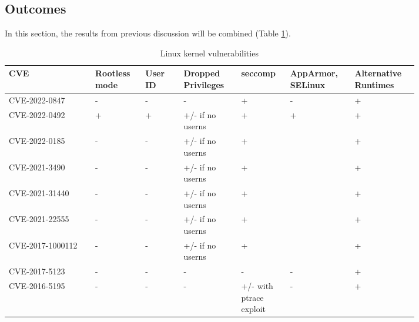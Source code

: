 \FloatBarrier
\clearpage


\subsection{Outcomes}

In this section, the results from previous discussion will be combined (Table \ref{tab:h:10}).

\begin{table}[H]
    \centering \small
    \begin{tabular}{| p{0.18\linewidth} | p{0.1\linewidth} | p{0.08\linewidth} | p{0.12\linewidth} | p{0.09\linewidth} | p{0.12\linewidth} | p{0.12\linewidth} |} \hline
    CVE & Rootless mode & User ID & Dropped Privileges & seccomp & AppArmor, SELinux & Alternative Runtimes \\ \hline
    CVE-2022-0847 & - & - & - & \cellcolor{green!25} + & - & \cellcolor{green!25} +  \\ \hline
    CVE-2022-0492 & \cellcolor{green!25} + & \cellcolor{green!25} + & \cellcolor{yellow!25} +/- \linebreak if no userns & \cellcolor{green!25} + & \cellcolor{green!25} + & \cellcolor{green!25} + \\ \hline
    CVE-2022-0185 & - & - & \cellcolor{yellow!25} +/- \linebreak if no userns & \cellcolor{green!25} + &  & \cellcolor{green!25} + \\ \hline
    CVE-2021-3490 & - & - & \cellcolor{yellow!25} +/- \linebreak if no userns & \cellcolor{green!25} + &  & \cellcolor{green!25} + \\ \hline
    CVE-2021-31440 & - & - & \cellcolor{yellow!25} +/- \linebreak if no userns & \cellcolor{green!25} + &  & \cellcolor{green!25} + \\ \hline
    CVE-2021-22555 & - & - & \cellcolor{yellow!25} +/- \linebreak if no userns & \cellcolor{green!25} + &  & \cellcolor{green!25} + \\ \hline
    CVE-2017-1000112 & - & - & \cellcolor{yellow!25} +/- \linebreak if no userns & \cellcolor{green!25} + &  & \cellcolor{green!25} + \\ \hline
    CVE-2017-5123 & - & - & - & - & - & \cellcolor{green!25} + \\ \hline
    CVE-2016-5195 & - & - & - & \cellcolor{yellow!25} +/- \linebreak with ptrace exploit & - & \cellcolor{green!25} + \\ \hline
\end{tabular}
    \caption{Linux kernel vulnerabilities}
    \label{tab:h:10}
\end{table}

